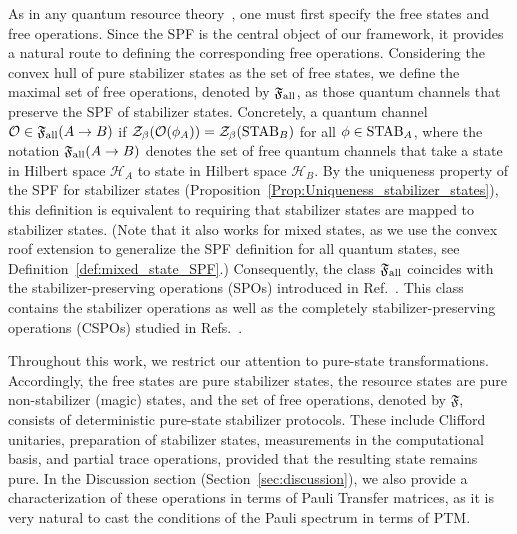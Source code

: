 \documentclass[aps,pra,superscriptaddress,twocolumn,longbibliography]{revtex4-2}
\def\mH{\mathcal{H}}
\def\mO{\mathcal{O}}
\def\mZ{\mathcal{Z}}
\def\mf{\mathfrak{F}}
\begin{document}
As in any quantum resource theory~\cite{RevModPhys.91.025001}, one must first specify the free states and free operations.
Since the SPF is the central object of our framework, it provides a natural route to defining the corresponding free operations.
Considering the convex hull of pure stabilizer states as the set of free states, we define the maximal set of free operations, denoted by $\mf_{\rm all}$, as those quantum channels that preserve the SPF of stabilizer states. 
Concretely, a quantum channel $\mO\in \mf_{\rm all}(A\to B)$ if $\mZ_{\beta}(\mO(\phi_A)) = \mZ_{\beta}({\rm STAB}_{B})$ for all $\phi\in {\rm STAB}_A$, where the notation $\mf_{\rm all}(A\to B)$ denotes the set of free quantum channels that take a state in Hilbert space $\mH_A$ to state in Hilbert space $\mH_B$. 
By the uniqueness property of the SPF for stabilizer states (Proposition~\ref{Prop:Uniqueness_stabilizer_states}), this definition is equivalent to requiring that stabilizer states are mapped to stabilizer states. (Note that it also works for mixed states, as we use the convex roof extension to generalize the SPF definition for all quantum states, see Definition~\ref{def:mixed_state_SPF}.)
Consequently, the class $\mf_{\rm all}$ coincides with the stabilizer-preserving operations (SPOs) introduced in Ref.~\cite{PhysRevA.97.062332}. This class contains the stabilizer operations as well as the completely stabilizer-preserving operations (CSPOs) studied in Refs.~\cite{Seddon2019Jul, PhysRevA.106.042422}.


Throughout this work, we restrict our attention to pure-state transformations. 
Accordingly, the free states are pure stabilizer states, the resource states are pure non-stabilizer (magic) states, and the set of free operations, denoted by $\mf$, consists of deterministic pure-state stabilizer protocols. 
These include Clifford unitaries, preparation of stabilizer states, measurements in the computational basis, and partial trace operations, provided that the resulting state remains pure.
In the Discussion section (Section~\ref{sec:discussion}), we also provide a characterization of these operations in terms of Pauli Transfer matrices, as it is very natural to cast the conditions of the Pauli spectrum in terms of PTM.
\end{document}
